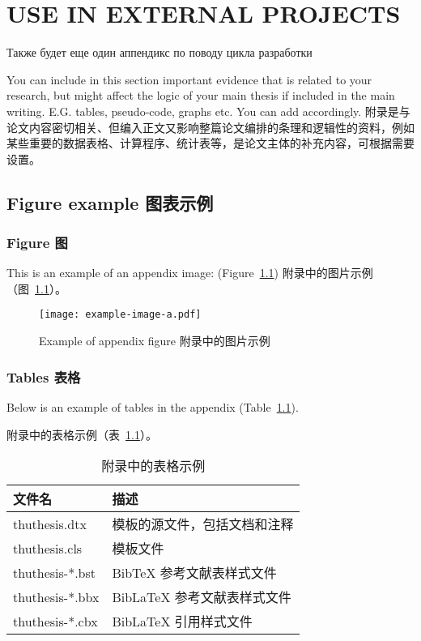 
\chapter{USE IN EXTERNAL PROJECTS}

Также будет еще один аппендикс по поводу цикла разработки

You can include in this section important evidence that is related to your research, but might affect the logic of your main thesis if included in the main writing. E.G. tables, pseudo-code, graphs etc. You can add accordingly.
附录是与论文内容密切相关、但编入正文又影响整篇论文编排的条理和逻辑性的资料，例如某些重要的数据表格、计算程序、统计表等，是论文主体的补充内容，可根据需要设置。

\section{Figure example 图表示例}

\subsection{Figure 图}

This is an example of an appendix image: (Figure~\ref{fig:appendix-figure})
附录中的图片示例（图~\ref{fig:appendix-figure}）。

\begin{figure}
  \centering
  \texttt{[image: example-image-a.pdf]}
  \caption{Example of appendix figure 附录中的图片示例}
  \label{fig:appendix-figure}
\end{figure}

\subsection{Tables 表格}

Below is an example of tables in the appendix (Table~\ref{tab:appendix-table}).

附录中的表格示例（表~\ref{tab:appendix-table}）。

\begin{table}
  \centering
  \caption{附录中的表格示例}
  \begin{tabular}{ll}
    \toprule
    文件名          & 描述                         \\
    \midrule
    thuthesis.dtx   & 模板的源文件，包括文档和注释 \\
    thuthesis.cls   & 模板文件                     \\
    thuthesis-*.bst & BibTeX 参考文献表样式文件    \\
    thuthesis-*.bbx & BibLaTeX 参考文献表样式文件  \\
    thuthesis-*.cbx & BibLaTeX 引用样式文件        \\
    \bottomrule
  \end{tabular}
  \label{tab:appendix-table}
\end{table}


